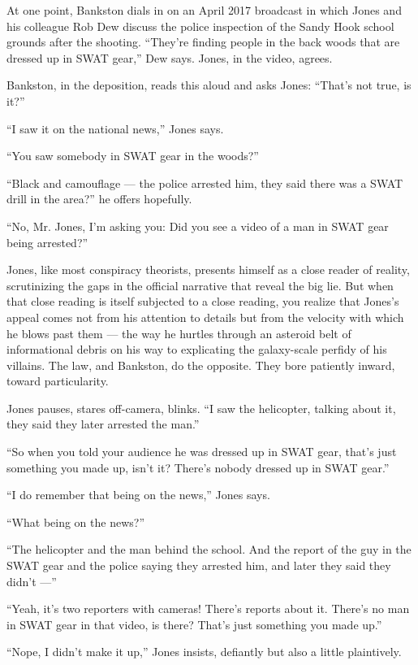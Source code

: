 At one point, Bankston dials in on an April 2017 broadcast in which
Jones and his colleague Rob Dew discuss the police inspection of the
Sandy Hook school grounds after the shooting. ``They're finding people
in the back woods that are dressed up in SWAT gear,'' Dew says. Jones,
in the video, agrees.

Bankston, in the deposition, reads this aloud and asks Jones: ``That's
not true, is it?''

``I saw it on the national news,'' Jones says.

``You saw somebody in SWAT gear in the woods?''

``Black and camouflage --- the police arrested him, they said there was
a SWAT drill in the area?'' he offers hopefully.

``No, Mr. Jones, I'm asking you: Did you see a video of a man in SWAT
gear being arrested?''

Jones, like most conspiracy theorists, presents himself as a close
reader of reality, scrutinizing the gaps in the official narrative that
reveal the big lie. But when that close reading is itself subjected to a
close reading, you realize that Jones's appeal comes not from his
attention to details but from the velocity with which he blows past them
--- the way he hurtles through an asteroid belt of informational debris
on his way to explicating the galaxy-scale perfidy of his villains. The
law, and Bankston, do the opposite. They bore patiently inward, toward
particularity.

Jones pauses, stares off-camera, blinks. ``I saw the helicopter, talking
about it, they said they later arrested the man.''

``So when you told your audience he was dressed up in SWAT gear, that's
just something you made up, isn't it? There's nobody dressed up in SWAT
gear.''

``I do remember that being on the news,'' Jones says.

``What being on the news?''

``The helicopter and the man behind the school. And the report of the
guy in the SWAT gear and the police saying they arrested him, and later
they said they didn't ---''

``Yeah, it's two reporters with cameras! There's reports about it.
There's no man in SWAT gear in that video, is there? That's just
something you made up.''

``Nope, I didn't make it up,'' Jones insists, defiantly but also a
little plaintively.


